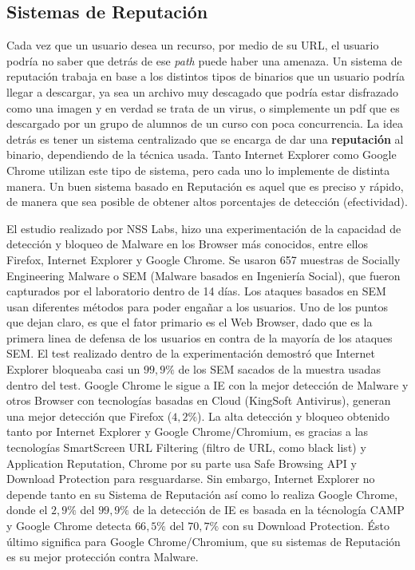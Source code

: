  \subsection{Sistemas de Reputación}
    Cada vez que un usuario desea un recurso, por medio de su URL, el usuario podría no saber que detrás de ese \textit{path} puede haber una amenaza. Un sistema de reputación trabaja en base a los distintos tipos de binarios que un usuario podría llegar a descargar, ya sea un archivo muy descagado que podría estar disfrazado como una imagen y en verdad se trata de un virus, o simplemente un pdf que es descargado por un grupo de alumnos de un curso con poca concurrencia. La idea detrás es tener un sistema centralizado que se encarga de dar una \textbf{reputación} al binario, dependiendo de la técnica usada. Tanto Internet Explorer como Google Chrome utilizan este tipo de sistema, pero cada uno lo implemente de distinta manera. Un buen sistema basado en Reputación es aquel que es preciso y rápido, de manera que sea posible de obtener altos porcentajes de detección (efectividad).

    El estudio \cite{rowSecSEMBlock} realizado por NSS Labs, hizo una experimentación de la capacidad de detección y bloqueo de Malware en los Browser más conocidos, entre ellos Firefox, Internet Explorer y Google Chrome. Se usaron 657 muestras de Socially Engineering Malware o SEM (Malware basados en Ingeniería Social), que fueron capturados por el laboratorio dentro de 14 días. Los ataques basados en SEM usan diferentes métodos para poder engañar a los usuarios. Uno de los puntos que dejan claro, es que el fator primario es el Web Browser, dado que es la primera linea de defensa de los usuarios en contra de la mayoría de los ataques SEM. El test realizado dentro de la experimentación demostró que Internet Explorer bloqueaba casi un \(99,9\%\) de los SEM sacados de la muestra usadas dentro del test. Google Chrome le sigue a IE con la mejor detección de Malware y otros Browser con tecnologías basadas en Cloud (KingSoft Antivirus), generan una mejor detección que Firefox (\(4,2\%\)). La alta detección y bloqueo obtenido tanto por Internet Explorer y Google Chrome/Chromium, es gracias a las tecnologías SmartScreen URL Filtering (filtro de URL, como black list) y Application Reputation, Chrome por su parte usa Safe Browsing API y Download Protection para resguardarse. Sin embargo, Internet Explorer no depende tanto en su Sistema de Reputación así como lo realiza Google Chrome, donde el \(2,9\%\) del \(99,9\%\) de la detección de IE es basada en la técnología CAMP y Google Chrome detecta \(66,5\%\) del \(70,7\%\) con su Download Protection. Ésto último significa para Google Chrome/Chromium, que su sistemas de Reputación es su mejor protección contra Malware. 

